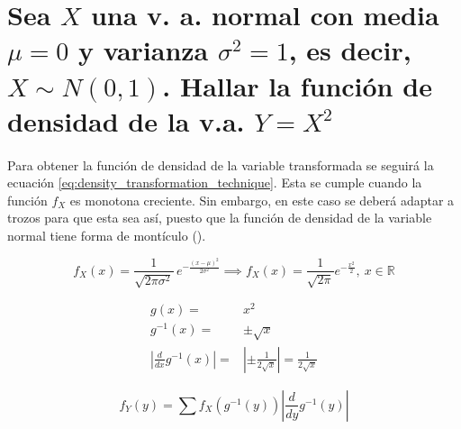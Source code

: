 \documentclass{article}
\begin{document}
	\maketitle
  \thispagestyle{empty}



	\section{Sea $X$ una v. a. normal con media $\mu = 0$ y varianza $\sigma^2 = 1$, es decir, $ X \sim N(0,1)$. Hallar la función de densidad de la v.a. $Y = X^2$}

    \paragraph{}
    Para obtener la función de densidad de la variable transformada se seguirá la ecuación \eqref{eq:density_transformation_technique}. Esta se cumple cuando la función $f_X$ es monotona creciente. Sin embargo, en este caso se deberá adaptar a trozos para que esta sea así, puesto que la función de densidad de la variable normal tiene forma de montículo ().


    \begin{equation}
      f_X(x) = {\displaystyle {\frac {1}{\sqrt {2\pi \sigma ^{2}}}}\,e^{-{\frac {(x-\mu )^{2}}{2\sigma ^{2}}}}} \implies f_X(x) = \frac{1}{\sqrt{2\pi} } e^{-\frac{x^2}{2}}, \ x \in \mathbb{R}
    \end{equation}


    \begin{align}
      g(x) =& x^2 \\
      g^{-1}(x) =& \pm \sqrt{x} \\
      \left| \frac{d}{dx} g^{-1} (x) \right| =& \left| \pm \frac{1}{2\sqrt{x}}  \right| = \frac{1}{2\sqrt{x}}
    \end{align}

    \begin{equation}
    \label{eq:density_transformation_technique}
      f_Y (y) = \sum f_X \left( g^{-1} (y) \right) \left| \frac{d}{dy} g^{-1} (y) \right|
    \end{equation}

    \begin{figure}
      \center
      \caption{}
      \label{}
    \end{figure}
\end{document}
